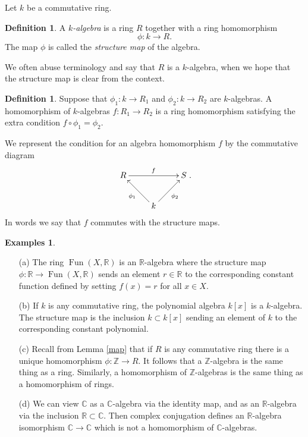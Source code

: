 \documentclass [12pt,oneside,a4paper,mathscr]{amsart}
\theoremstyle{definition}
\newtheorem{defn}[thm]{Definition}
\newtheorem{examples}[thm]{Examples}
\newcommand {\C}{\mathbb C}
\newcommand{\R}{\mathbb{R}}
\newcommand{\Z}{\mathbb Z}
\newcommand{\Fun}{\operatorname{Fun}}
\begin{document}
Let $k$ be a commutative ring.

\begin{defn}A \emph{$k$-algebra} is a ring $R$ together with a ring homomorphism \[\phi\colon k \to R.\] 
The map $\phi$ is called the \emph{structure map} of the algebra.\end{defn}

We often abuse terminology and say that $R$ is a $k$-algebra, when we hope that the structure map is clear from the context.

\begin{defn}
Suppose that $\phi_1\colon k\to R_1$ and $\phi_2\colon k \to R_2$ are $k$-algebras. A homomorphism of $k$-algebras $f\colon R_1 \to R_2$ is a ring homomorphism satisfying the extra condition
$f\circ \phi_1=\phi_2$.
\end{defn}

 We represent the condition for an algebra homomorphism $f$ by the commutative diagram
\[\xymatrix{ R \ar@{>}[rr]^{f} && S \\ &k \ar@{>}[ur]_{\phi_2} \ar@{>}[ul]^{\phi_1}}.\]
In words we say that $f$ commutes with the structure maps.


\begin{examples}
\begin{itemize}

\item[(a)] The ring $\Fun(X,\R)$ is an $\R$-algebra where the structure map $\phi\colon \R \to \Fun(X,\R)$ sends an element $r\in \R$ to the corresponding constant function defined by setting $f(x)=r$ for all $x\in X$.
\smallskip

\item[(b)] If $k$ is any commutative ring, the polynomial algebra $k[x]$ is a $k$-algebra. The structure map is the inclusion $k\subset k[x]$ sending an element of $k$ to the corresponding constant polynomial.

\smallskip \item[(c)] Recall from Lemma \ref{map} that if $R$ is any commutative ring there is a unique homomorphism $\phi\colon \Z\to R$. It follows that a $\Z$-algebra is the same thing as a ring. Similarly, a homomorphism of $\Z$-algebras is the same thing as a homomorphism  of rings.
\smallskip

\item[(d)] We can view $\C$ as a $\C$-algebra via the identity map, and as an $\R$-algebra via the inclusion $\R \subset \C$. Then complex conjugation defines an $\R$-algebra isomorphism $\C \to \C$ which is not a homomorphism of $\C$-algebras.
\end{itemize}
\end{examples}
\end{document}
